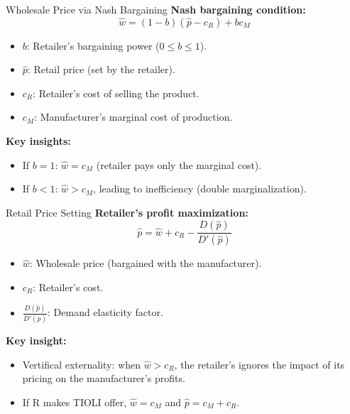 \documentclass[aspectratio=169]{beamer}  %
\begin{document}
\begin{frame}{Wholesale Price via Nash Bargaining}
    \textbf{Nash bargaining condition:}
    \[
    \hat{w} = (1-b)(\hat{p} - c_R) + b c_M
    \]
    \begin{itemize}
        \item \(b\): Retailer's bargaining power (\(0 \leq b \leq 1\)).
        \item \(\hat{p}\): Retail price (set by the retailer).
        \item \(c_R\): Retailer's cost of selling the product.
        \item \(c_M\): Manufacturer's marginal cost of production.
    \end{itemize}
    \vspace{0.5cm}
    \textbf{Key insights:}
    \begin{itemize}
        \item If \(b = 1\): \(\hat{w} = c_M\) (retailer pays only the marginal cost).
        \item If \(b < 1\): \(\hat{w} > c_M\), leading to inefficiency (double marginalization).
    \end{itemize}
\end{frame}

\begin{frame}{Retail Price Setting}
    \textbf{Retailer's profit maximization:}
    \[
    \hat{p} = \hat{w} + c_R - \frac{D(\hat{p})}{D'(\hat{p})}
    \]
    \begin{itemize}
        \item \(\hat{w}\): Wholesale price (bargained with the manufacturer).
        \item \(c_R\): Retailer's cost.
        \item \(\frac{D(\hat{p})}{D'(\hat{p})}\): Demand elasticity factor.
    \end{itemize}
    \vspace{0.5cm}
    \textbf{Key insight:}
    \begin{itemize}
        \item Vertifical externality: when $\hat{w} > c_R$, the retailer's ignores the impact of its pricing on the manufacturer's profits.
        \item If R makes TIOLI offer, $\hat{w} = c_M$ and $\hat{p} = c_M + c_R$.
    \end{itemize}
\end{frame}
\end{document}
